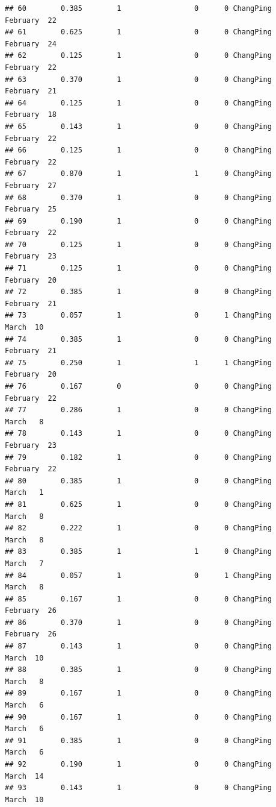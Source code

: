 \documentclass[
]{article}
\begin{document}
\begin{verbatim}
## 60        0.385        1                 0      0 ChangPing  February  22
## 61        0.625        1                 0      0 ChangPing  February  24
## 62        0.125        1                 0      0 ChangPing  February  22
## 63        0.370        1                 0      0 ChangPing  February  21
## 64        0.125        1                 0      0 ChangPing  February  18
## 65        0.143        1                 0      0 ChangPing  February  22
## 66        0.125        1                 0      0 ChangPing  February  22
## 67        0.870        1                 1      0 ChangPing  February  27
## 68        0.370        1                 0      0 ChangPing  February  25
## 69        0.190        1                 0      0 ChangPing  February  22
## 70        0.125        1                 0      0 ChangPing  February  23
## 71        0.125        1                 0      0 ChangPing  February  20
## 72        0.385        1                 0      0 ChangPing  February  21
## 73        0.057        1                 0      1 ChangPing     March  10
## 74        0.385        1                 0      0 ChangPing  February  21
## 75        0.250        1                 1      1 ChangPing  February  20
## 76        0.167        0                 0      0 ChangPing  February  22
## 77        0.286        1                 0      0 ChangPing     March   8
## 78        0.143        1                 0      0 ChangPing  February  23
## 79        0.182        1                 0      0 ChangPing  February  22
## 80        0.385        1                 0      0 ChangPing     March   1
## 81        0.625        1                 0      0 ChangPing     March   8
## 82        0.222        1                 0      0 ChangPing     March   8
## 83        0.385        1                 1      0 ChangPing     March   7
## 84        0.057        1                 0      1 ChangPing     March   8
## 85        0.167        1                 0      0 ChangPing  February  26
## 86        0.370        1                 0      0 ChangPing  February  26
## 87        0.143        1                 0      0 ChangPing     March  10
## 88        0.385        1                 0      0 ChangPing     March   8
## 89        0.167        1                 0      0 ChangPing     March   6
## 90        0.167        1                 0      0 ChangPing     March   6
## 91        0.385        1                 0      0 ChangPing     March   6
## 92        0.190        1                 0      0 ChangPing     March  14
## 93        0.143        1                 0      0 ChangPing     March  10

\end{verbatim}
\end{document}
